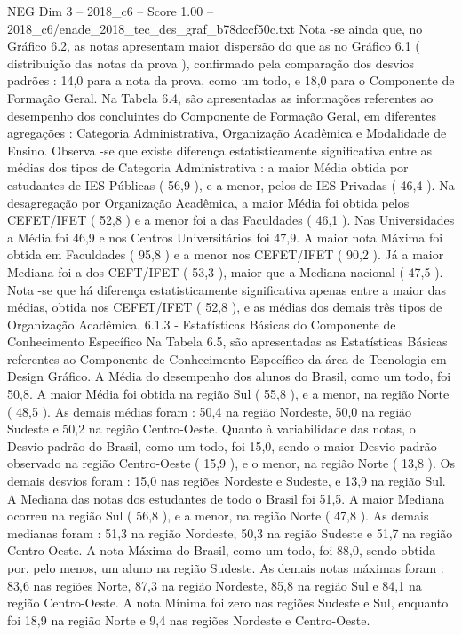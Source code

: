 \begin{textsample}{NEG Dim 3 – 2018\_c6 – Score 1.00 – 2018\_c6/enade\_2018\_tec\_des\_graf\_b78dccf50c.txt}
Nota -se ainda que, no Gráfico 6.2, as notas apresentam maior dispersão do que as no Gráfico 6.1 ( distribuição das notas da prova ), confirmado pela comparação dos desvios padrões : 14,0 para a nota da prova, como um todo, e 18,0 para o Componente de Formação Geral.
Na Tabela 6.4, são apresentadas as informações referentes ao desempenho dos concluintes do Componente de Formação Geral, em diferentes agregações : Categoria Administrativa, Organização Acadêmica e Modalidade de Ensino.
Observa -se que existe diferença estatisticamente significativa entre as médias dos tipos de Categoria Administrativa : a maior Média obtida por estudantes de IES Públicas ( 56,9 ), e a menor, pelos de IES Privadas ( 46,4 ).
Na desagregação por Organização Acadêmica, a maior Média foi obtida pelos CEFET/IFET ( 52,8 ) e a menor foi a das Faculdades ( 46,1 ).
Nas Universidades a Média foi 46,9 e nos Centros Universitários foi 47,9.
A maior nota Máxima foi obtida em Faculdades ( 95,8 ) e a menor nos CEFET/IFET ( 90,2 ).
Já a maior Mediana foi a dos CEFT/IFET ( 53,3 ), maior que a Mediana nacional ( 47,5 ).
Nota -se que há diferença estatisticamente significativa apenas entre a maior das médias, obtida nos CEFET/IFET ( 52,8 ), e as médias dos demais três tipos de Organização Acadêmica. 6.1.3 - Estatísticas Básicas do Componente de Conhecimento Específico Na Tabela 6.5, são apresentadas as Estatísticas Básicas referentes ao Componente de Conhecimento Específico da área de Tecnologia em Design Gráfico.
A Média do desempenho dos alunos do Brasil, como um todo, foi 50,8.
A maior Média foi obtida na região Sul ( 55,8 ), e a menor, na região Norte ( 48,5 ).
As demais médias foram : 50,4 na região Nordeste, 50,0 na região Sudeste e 50,2 na região Centro-Oeste.
Quanto à variabilidade das notas, o Desvio padrão do Brasil, como um todo, foi 15,0, sendo o maior Desvio padrão observado na região Centro-Oeste ( 15,9 ), e o menor, na região Norte ( 13,8 ).
Os demais desvios foram : 15,0 nas regiões Nordeste e Sudeste, e 13,9 na região Sul.
A Mediana das notas dos estudantes de todo o Brasil foi 51,5.
A maior Mediana ocorreu na região Sul ( 56,8 ), e a menor, na região Norte ( 47,8 ).
As demais medianas foram : 51,3 na região Nordeste, 50,3 na região Sudeste e 51,7 na região Centro-Oeste.
A nota Máxima do Brasil, como um todo, foi 88,0, sendo obtida por, pelo menos, um aluno na região Sudeste.
As demais notas máximas foram : 83,6 nas regiões Norte, 87,3 na região Nordeste, 85,8 na região Sul e 84,1 na região Centro-Oeste.
A nota Mínima foi zero nas regiões Sudeste e Sul, enquanto foi 18,9 na região Norte e 9,4 nas regiões Nordeste e Centro-Oeste.

\end{textsample}
